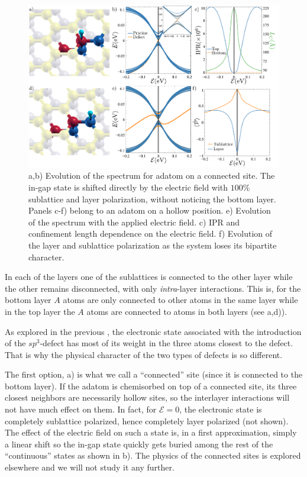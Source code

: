 \begin{figure}[h!]
\centering
\includegraphics{defects/fig/hollow_connected.pdf}
\vspace{-20pt}
\caption{a,b) Evolution of the spectrum for adatom on a connected site. The in-gap state is shifted directly by the electric field with $100\%$ sublattice and layer polarization, without noticing the bottom layer. Panels c-f) belong to an adatom on a hollow position. e) Evolution of the spectrum with the applied electric field. c) IPR and confinement length dependence on the electric field. f) Evolution of the layer and sublattice polarization as the system loses its bipartite character.}
\label{fig:hollow-connected}
\end{figure}

In each of the layers one of the sublattices is connected to the other layer while the other remains disconnected, with only \emph{intra}-layer interactions. This is, for the bottom layer $A$ atoms are only connected to other atoms in the same layer while in the top layer the $A$ atoms are connected to atoms in both layers (see a,d)).
\medskip

As explored in the previous , the electronic state associated with the introduction of the $sp^3$-defect has most of its weight in the three atoms closest to the defect. That is why the physical character of the two types of defects is so different.

The first option, a) is what we call a ``connected'' site (since it is connected to the bottom layer). If the  adatom is chemisorbed on top of a connected site, its three closest neighbors are necessarily hollow sites, so the interlayer interactions will not have much effect on them. In fact, for $\mathcal{E}=0$, the electronic state is completely sublattice polarized, hence completely layer polarized\cite{Castro2010} (not shown).
The effect of the electric field on such a state is, in a first approximation, simply a linear shift so the in-gap state quickly gets buried among the rest of the ``continuous'' states as shown in b). The physics of the connected sites is explored elsewhere\cite{Castro2010} and we will not study it any further.

